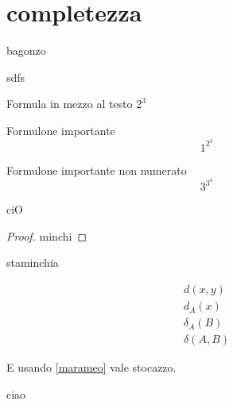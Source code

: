 \section{completezza}
bagonzo

sdfs

Formula in mezzo al testo $2^3$

Formulone importante
\begin{equation}
1^{2^3}
\end{equation}

Formulone importante non numerato
\begin{equation*}
3^{3^4}
\end{equation*}

\begin{theorem}\label{marameo}
ciO
\end{theorem}
\begin{proof}
minchi
\end{proof}

\begin{remark}
staminchia
\end{remark}

\begin{align}
d(x,y)\\
d_A(x)\\
\delta_A(B)\\
\delta(A,B)
\end{align}

E usando \cref{marameo} vale stocazzo.

ciao